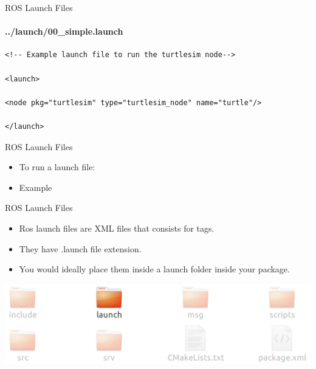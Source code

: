 \documentclass{beamer}
\begin{document}
\begin{frame}[fragile]{ROS Launch Files}
    \framesubtitle{../launch/00\_simple.launch}
    \begin{lstlisting}
<!-- Example launch file to run the turtlesim node-->

<launch>

<node pkg="turtlesim" type="turtlesim_node" name="turtle"/>

</launch>
    \end{lstlisting}
\end{frame}


\begin{frame}{ROS Launch Files}
    \begin{itemize}
        \item To run a launch file:
             \begin{terminal}
                 \color{green} 
              \end{terminal}
              
        \item Example
        \begin{terminal}
            \color{green} 
          \end{terminal}              
    \end{itemize}  
\end{frame}


\begin{frame}{ROS Launch Files}
    \begin{itemize}
        \item Ros launch files are XML files that consists for tags.
        
        \item They have {\ttfamily \colorbox{gray!30!white}{.launch}} file extension.
        
        \item You would ideally place them inside a {\ttfamily \colorbox{gray!30!white}{launch}} folder inside your package.
    \end{itemize}  
    \includegraphics[width=1.0\linewidth]{figures/package2.png}
\end{frame}
\end{document}
